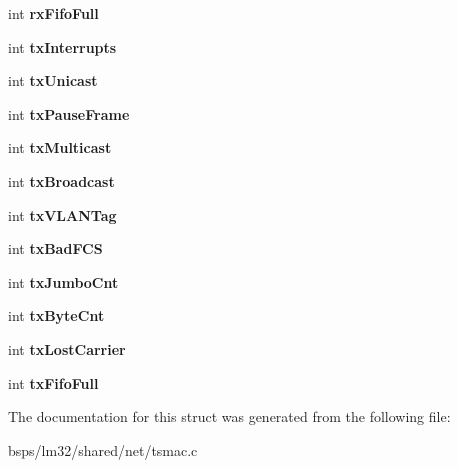 \begin{DoxyCompactItemize}
\item 
\mbox{\label{structtsmac__softc_a6ca5c5cc7b8b8cac0ba885a048202bf1}} 
int {\bfseries rx\+Fifo\+Full}
\item 
\mbox{\label{structtsmac__softc_a59c25715830afb5e4ed68928059d89b5}} 
int {\bfseries tx\+Interrupts}
\item 
\mbox{\label{structtsmac__softc_a4efa57c5c62453301926fe92f3e84219}} 
int {\bfseries tx\+Unicast}
\item 
\mbox{\label{structtsmac__softc_a7346cfb1fe80f9ab44be5e93a54b97c8}} 
int {\bfseries tx\+Pause\+Frame}
\item 
\mbox{\label{structtsmac__softc_a605eef9da76983c6cf0a8f396e179916}} 
int {\bfseries tx\+Multicast}
\item 
\mbox{\label{structtsmac__softc_a648401054203e46b158294a1c8451e8f}} 
int {\bfseries tx\+Broadcast}
\item 
\mbox{\label{structtsmac__softc_a3522497e8ad85c9c9f9d736b66e15f93}} 
int {\bfseries tx\+V\+L\+A\+N\+Tag}
\item 
\mbox{\label{structtsmac__softc_a10e7942c54d99e722895d0dc90631360}} 
int {\bfseries tx\+Bad\+F\+CS}
\item 
\mbox{\label{structtsmac__softc_a870774ab007e94c0fc107009bd1c5f07}} 
int {\bfseries tx\+Jumbo\+Cnt}
\item 
\mbox{\label{structtsmac__softc_a5141fe709d42fec503bce1e567088b8e}} 
int {\bfseries tx\+Byte\+Cnt}
\item 
\mbox{\label{structtsmac__softc_a6ecc2aab44e1132b6bc629e731113a23}} 
int {\bfseries tx\+Lost\+Carrier}
\item 
\mbox{\label{structtsmac__softc_a6b56256715ad610b5039558863b0eec5}} 
int {\bfseries tx\+Fifo\+Full}
\end{DoxyCompactItemize}


The documentation for this struct was generated from the following file\+:\begin{DoxyCompactItemize}
\item 
bsps/lm32/shared/net/tsmac.\+c\end{DoxyCompactItemize}
